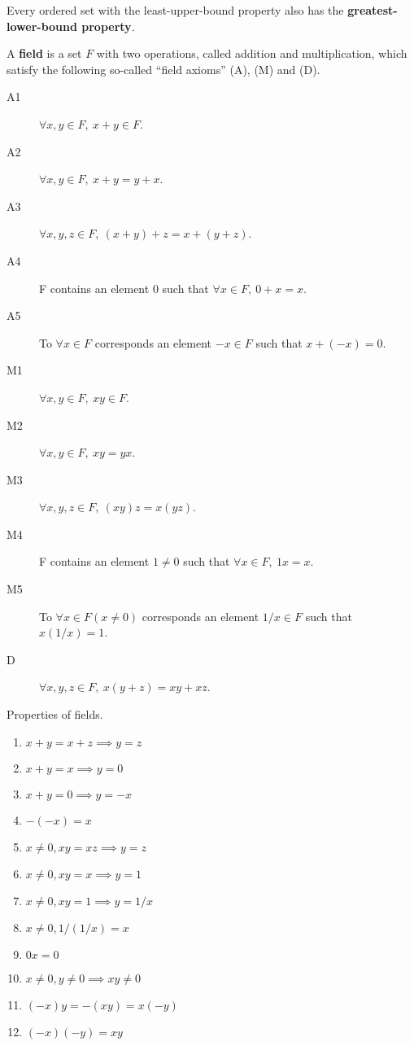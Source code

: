     \begin{theo}
        Every ordered set with the least-upper-bound property also has the \textbf{greatest-lower-bound property}.
    \end{theo}
    
    \begin{defi}
        A \textbf{field} is a set $F$ with two operations, called addition and multiplication, which satisfy the following so-called ``field axioms'' (A), (M) and (D).
        \begin{description}
            \item[A1] $\forall x, y \in F, \ x+y \in F$.
            \item[A2] $\forall x,y \in F, \ x+y=y+x$.
            \item[A3] $\forall x,y,z \in F, \ (x+y)+z=x+(y+z)$.
            \item[A4] F contains an element $0$ such that $\forall x\in F, \ 0 + x = x$.
            \item[A5] To $\forall x \in F$ corresponds an element $-x \in F$ such that $x + (-x) = 0$.
            \item[M1] $\forall x, y \in F, \ xy \in F$.
            \item[M2] $\forall x,y \in F, \ xy=yx$.
            \item[M3] $\forall x,y,z \in F, \ (xy)z=x(yz)$.
            \item[M4] F contains an element $1 \neq 0$ such that $\forall x\in F, \ 1x = x$.
            \item[M5] To $\forall x \in F (x \neq 0)$ corresponds an element $1/x \in F$ such that $x (1/x) = 1$.
            \item[D] $\forall x,y,z \in F, \ x(y+z)=xy+xz$.
        \end{description}
    \end{defi}
    \begin{prop} Properties of fields.
        \begin{enumerate}
            \item $x+y=x+z \implies y=z$
            \item $x+y=x \implies y=0$
            \item $x+y=0 \implies y=-x$
            \item $-(-x)=x$
            \item $x \neq 0, xy=xz \implies y=z$
            \item $x \neq 0, xy=x \implies y=1$
            \item $x \neq 0, xy=1 \implies y=1/x$
            \item $x \neq 0, 1/(1/x) = x$
            \item $0x = 0$
            \item $x \neq 0, y \neq 0 \implies xy \neq 0$
            \item $(-x)y=-(xy)=x(-y)$
            \item $(-x)(-y)=xy$
        \end{enumerate}
    \end{prop}

